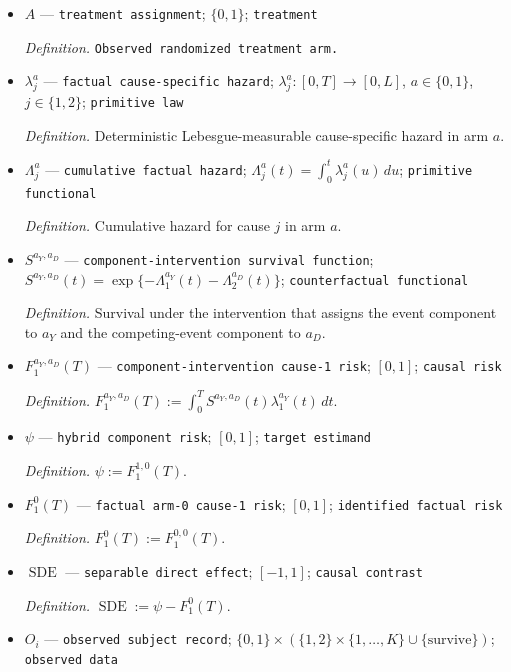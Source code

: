 \documentclass{article}
\begin{document}
\begin{itemize}
  \item \(A\) --- \texttt{treatment assignment}; \(\{0,1\}\); \texttt{treatment}
  \par\smallskip\noindent\emph{Definition.} \texttt{Observed randomized treatment arm.}
  \item \(\lambda_j^a\) --- \texttt{factual cause-\allowbreak{}specific hazard}; \(\lambda_j^a:[0,T]\to[0,L]\), \(a\in\{0,1\}\), \(j\in\{1,2\}\); \texttt{primitive law}
  \par\smallskip\noindent\emph{Definition.} Deterministic Lebesgue-measurable cause-specific hazard in arm \(a\).
  \item \(\Lambda_j^a\) --- \texttt{cumulative factual hazard}; \(\Lambda_j^a(t)=\int_0^t\lambda_j^a(u)\,du\); \texttt{primitive functional}
  \par\smallskip\noindent\emph{Definition.} Cumulative hazard for cause \(j\) in arm \(a\).
  \item \(S^{a_Y,a_D}\) --- \texttt{component-\allowbreak{}intervention survival function}; \(S^{a_Y,a_D}(t)=\exp\{-\Lambda_1^{a_Y}(t)-\Lambda_2^{a_D}(t)\}\); \texttt{counterfactual functional}
  \par\smallskip\noindent\emph{Definition.} Survival under the intervention that assigns the event component to \(a_Y\) and the competing-event component to \(a_D\).
  \item \(F_1^{a_Y,a_D}(T)\) --- \texttt{component-\allowbreak{}intervention cause-\allowbreak{}1 risk}; \([0,1]\); \texttt{causal risk}
  \par\smallskip\noindent\emph{Definition.} \(F_1^{a_Y,a_D}(T):=\int_0^T S^{a_Y,a_D}(t)\lambda_1^{a_Y}(t)\,dt\).
  \item \(\psi\) --- \texttt{hybrid component risk}; \([0,1]\); \texttt{target estimand}
  \par\smallskip\noindent\emph{Definition.} \(\psi:=F_1^{1,0}(T)\).
  \item \(F_1^0(T)\) --- \texttt{factual arm-\allowbreak{}0 cause-\allowbreak{}1 risk}; \([0,1]\); \texttt{identified factual risk}
  \par\smallskip\noindent\emph{Definition.} \(F_1^0(T):=F_1^{0,0}(T)\).
  \item \(\operatorname{SDE}\) --- \texttt{separable direct effect}; \([-1,1]\); \texttt{causal contrast}
  \par\smallskip\noindent\emph{Definition.} \(\operatorname{SDE}:=\psi-F_1^0(T)\).
  \item \(O_i\) --- \texttt{observed subject record}; \(\{0,1\}\times(\{1,2\}\times\{1,\ldots,K\}\cup\{\mathrm{survive}\})\); \texttt{observed data}

\end{itemize}
\end{document}
